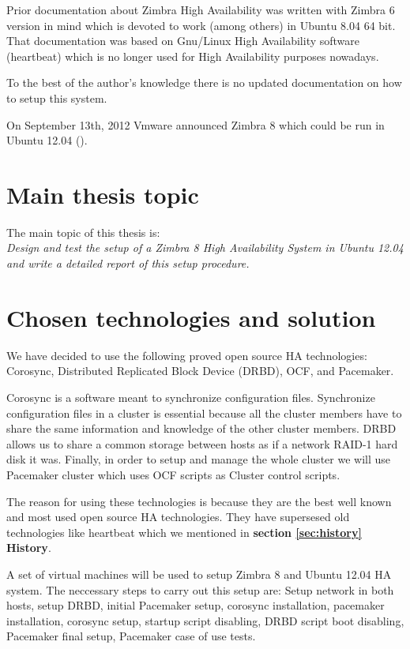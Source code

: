 Prior documentation about Zimbra High Availability was written with Zimbra 6 version in mind which is devoted to work (among others) in Ubuntu 8.04 64 bit. That documentation was based on Gnu/Linux High Availability software (heartbeat) which is no longer used for High Availability purposes nowadays.

To the best of the author's knowledge there is no updated documentation on how to setup this system.

On September 13th, 2012 Vmware announced Zimbra 8 which could be run in Ubuntu 12.04 (\cite{VmwareZimbra8Announce}).

\section {Main thesis topic}
The main topic of this thesis is: \\
\textit{Design and test the setup of a Zimbra 8 High Availability System in Ubuntu 12.04 and write a detailed report of this setup procedure.}

\section {Chosen technologies and solution}
We have decided to use the following proved open source HA technologies:\\ Corosync, Distributed Replicated Block Device (DRBD), OCF, and Pacemaker.

Corosync is a software meant to synchronize configuration files. Synchronize configuration files in a cluster is essential because all the cluster members have to share the same information and knowledge of the other cluster members. DRBD allows us to share a common storage between hosts as if a network RAID-1 hard disk it was. Finally, in order to setup and manage the whole cluster we will use Pacemaker cluster which uses OCF scripts as Cluster control scripts.

The reason for using these technologies is because they are the best well known and most used open source HA technologies. They have supersesed old technologies like heartbeat which we mentioned in \textbf{section {\ref{sec:history} History}}.

A set of virtual machines will be used to setup Zimbra 8 and Ubuntu 12.04 HA system. The neccessary steps to carry out this setup are: Setup network in both hosts, setup DRBD, initial Pacemaker setup, corosync installation, pacemaker installation, corosync setup, startup script disabling, DRBD script boot disabling, Pacemaker final setup, Pacemaker case of use tests.

